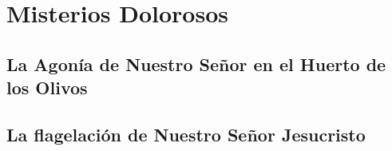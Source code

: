 \documentclass[a4paper,11pt]{article}
\begin{document}
    \newpage
        
  \section*{\hfil Misterios Dolorosos \hfil}
    
    \subsection*{\hfil La Agonía de Nuestro Señor en el Huerto de los Olivos \hfil}
      
      
      \medskip

      
      \medskip

      
      \medskip

      
      \medskip

      
      \medskip

      
      \medskip

      
      \medskip

      
      \medskip

      
      \medskip

      
      \medskip

    \subsection*{\hfil La flagelación de Nuestro Señor Jesucristo \hfil}
      
      
      \medskip

      
      \medskip

      
      \medskip

      
      \medskip

      
      \medskip
\end{document}
